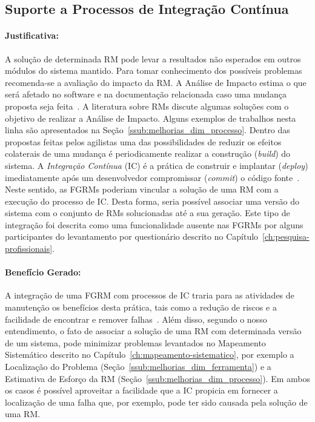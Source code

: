 \subsection{Suporte a Processos de Integração Contínua}\label{sub:suporte_integracao_continua}


\paragraph{Justificativa:}\label{par:justificativa_s05}

A solução de determinada RM pode levar a resultados não esperados em outros
módulos do sistema mantido. Para tomar conhecimento dos possíveis problemas
recomenda-se a avaliação do impacto da RM\@. A Análise de Impacto estima o que
será afetado no software e na documentação relacionada caso uma mudança proposta
seja feita~\cite{arnold1996software}. A literatura sobre RMs discute algumas
soluções com o objetivo de realizar a Análise de Impacto. Alguns exemplos de
trabalhos nesta linha são apresentados na
Seção~\ref{ssub:melhorias_dim_processo}. Dentro das propostas feitas pelos
agilistas uma das possibilidades de reduzir os efeitos colaterais de uma mudança
é periodicamente realizar a construção (\textit{build}) do sistema. A
\textit{Integração Contínua} (IC) é a prática de construir e implantar
(\textit{deploy}) imediatamente após um desenvolvedor compromissar
(\textit{commit}) o código fonte~\cite{aiello2010configuration}. Neste sentido,
as FGRMs poderiam vincular a solução de uma RM com a execução do processo de
IC\@. Desta forma, seria possível associar uma versão do sistema com o conjunto
de RMs solucionadas até a sua geração. Este tipo de integração foi descrita
como uma funcionalidade ausente nas FGRMs por alguns participantes do
levantamento por questionário descrito no
Capítulo~\ref{ch:pesquisa-profissionais}.

\paragraph{Benefício Gerado:}\label{par:papéis_afetados_s05}

A integração de uma FGRM com processos de IC traria para as atividades de
manutenção os benefícios desta prática, tais como a redução de riscos e a
facilidade de encontrar e remover falhas~\cite{fowler2006continuous}.  Além
disso, segundo o nosso entendimento, o fato de associar a solução de uma RM com
determinada versão de um sistema, pode minimizar problemas levantados no
Mapeamento Sistemático descrito no Capítulo~\ref{ch:mapeamento-sistematico}, por
exemplo a Localização do Problema (Seção~\ref{ssub:melhorias_dim_ferramenta}) e
a Estimativa de Esforço da RM (Seção~\ref{ssub:melhorias_dim_processo}). Em
ambos os casos é possível aproveitar a facilidade que a IC propicia em fornecer
a localização de uma falha que, por exemplo, pode ter sido causada pela solução
de uma RM\@.

